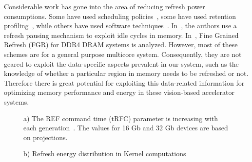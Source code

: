Considerable work has gone into the area of reducing refresh power consumptions. Some have used scheduling policies~\cite{Stuecheli2010}, some have used retention profiling~\cite{Liu2012}, while others have used software techniques~\cite{Liu2012}. In~\cite{Nair2013}, the authors use a refresh pausing mechanism to exploit idle cycles in memory. In~\cite{Mukundan2013}, Fine Grained Refresh (FGR) for DDR4 DRAM systems is analyzed. 
However, most of these schemes are for a general purpose multicore system. Consequently, they are not geared to exploit the data-specific aspects prevalent in our system, such as the knowledge of whether a particular region in memory needs to be refreshed or not. Therefore there is great potential for exploiting this data-related information for optimizing memory performance and energy in these vision-based accelerator systems.


\begin{figure}[ht!]
\begin{minipage}[b]{1\linewidth}
\centering
{}
\caption{\label{fig:refreshTrends}a) The REF command time (tRFC) parameter is increasing with each generation~\cite{jedec-sdram-standards}. The values for 16 Gb and 32 Gb devices are based on projections.}
\vspace{0.1in}
\end{minipage}
\addtocounter{figure}{-1}
\begin{minipage}[b]{1\linewidth}
\centering
{}
\caption{\label{fig:refreshTrends}b) Refresh energy distribution in Kernel computations}
\end{minipage}
\vspace{-0.2in}
\end{figure}

